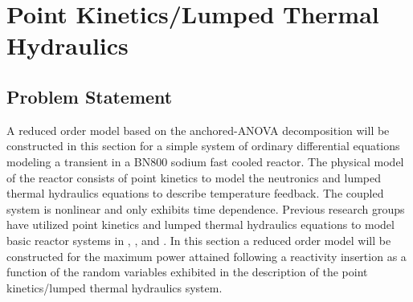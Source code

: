 \section{Point Kinetics/Lumped Thermal Hydraulics}
\label{sec:pointkinetics_th}

\subsection{Problem Statement}
\label{subsec:pointkinetics_th_ps}

A reduced order model based on the anchored-\ac{ANOVA} decomposition will be constructed in this section for a simple system of ordinary differential equations modeling a transient in a BN800 sodium fast cooled reactor. The physical model of the reactor consists of point kinetics to model the neutronics and lumped thermal hydraulics equations to describe temperature feedback. The coupled system is nonlinear and only exhibits time dependence. Previous research groups have utilized point kinetics and lumped thermal hydraulics equations to model basic reactor systems in \cite{Gilli_annals}, \cite{Gilli_mc2011}, and \cite{Housiadas}. In this section a reduced order model will be constructed for the maximum power attained following a reactivity insertion as a function of the random variables exhibited in the description of the point kinetics/lumped thermal hydraulics system.  

